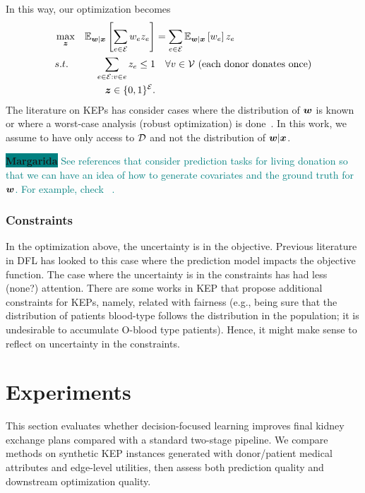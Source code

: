 \documentclass{article}
\newcommand{\margarida}[1]{\colorbox{teal}{\color{white}   \textsf{\textbf{Margarida}}} \textcolor{teal}{#1}}
\begin{document}
In this way, our optimization becomes
\begin{align}
    & \max_{\boldsymbol{z}} & \mathbb{E}_{\boldsymbol{w} | \boldsymbol{x} }\left[\sum_{e \in \mathcal{E}} w_e z_e \right] &= \sum_{e \in \mathcal{E}} \mathbb{E}_{\boldsymbol{w} | \boldsymbol{x} }\left[w_e \right] z_e\\
    & s.t. & \sum_{e \in \mathcal{E}: v \in e} z_e \leq 1 &\quad  \forall v \in \mathcal{V} \textrm{ (each donor donates once)}\\
    & & \boldsymbol{z} \in \{0,1\}^{\mathcal{E}}.
\end{align}
The literature on KEPs has consider cases where the distribution of $\boldsymbol{w}$ is known~\citep{alvelos2019maximizing} or where a worst-case analysis (robust optimization) is done~\citep{carvalho2021robust,blom2024cutting}. In this work, we assume to have only access to $\mathcal{D}$ and not the distribution of $\boldsymbol{w} | \boldsymbol{x}$.

\margarida{
See references that consider prediction tasks for living donation so that we can have an idea of how to generate covariates and the ground truth for $\boldsymbol{w}$. For example, check ~\cite{massie2016risk,luck2017deep,monteiro2019reinforcement}.
}


\subsubsection{Constraints}
In the optimization above, the uncertainty is in the objective. Previous literature in DFL has looked to this case where the prediction model impacts the objective function. The case where the uncertainty is in the constraints has had less (none?) attention. There are some works in KEP that propose additional constraints for KEPs, namely, related with fairness (e.g., being sure that the distribution of patients blood-type follows the distribution in the population; it is undesirable to accumulate O-blood type patients). Hence, it might make sense to reflect on uncertainty in the constraints.



\section{Experiments}
\label{sec:experiments}
This section evaluates whether decision-focused learning improves final kidney exchange plans compared with a standard two-stage pipeline. We compare methods on synthetic KEP instances generated with donor/patient medical attributes and edge-level utilities, then assess both prediction quality and downstream optimization quality.
\end{document}
